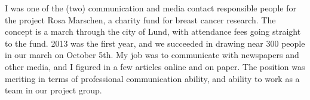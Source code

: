 \documentclass[a4paper]{article}
\begin{document}
I was one of the (two) communication and media contact responsible people for the project Rosa Marschen, a charity fund for breast cancer research. The concept is a march through the city of Lund, with attendance fees going straight to the fund. 2013 was the first year, and we succeeded in drawing near 300 people in our march on October 5th. My job was to communicate with newspapers and other media, and I figured in a few articles online and on paper. The position was meriting in terms of professional communication ability, and ability to work as a team in our project group.
\end{document}
